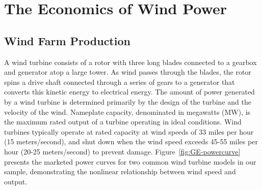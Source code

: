 \documentclass[12pt]{article}
\begin{document}
\section{The Economics of Wind Power \label{sec: Background}}

\subsection{Wind Farm Production \label{subsec:WindEcon}}

A wind turbine consists of a rotor with three long blades connected to a gearbox and generator atop a large tower. As wind passes through the blades, the rotor spins a drive shaft connected through a series of gears to a generator that converts this kinetic energy to electrical energy. The amount of power generated by a wind turbine is determined primarily by the design of the turbine and the velocity of the wind. Nameplate capacity, denominated in megawatts (MW), is the maximum rated output of a turbine operating in ideal conditions. Wind turbines typically operate at rated capacity at wind speeds of 33 miles per hour (15 meters/second), and shut down when the wind speed exceeds 45-55 miles per hour (20-25 meters/second) to prevent damage. Figure~\ref{fig:GE-powercurve} presents the marketed power curves for two common wind turbine models in our sample, demonstrating the nonlinear relationship between wind speed and output.
\end{document}
